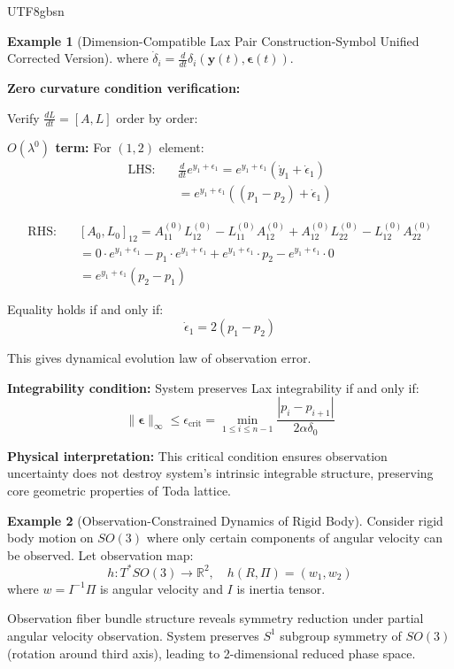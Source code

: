 \documentclass[a4paper,12pt]{extarticle}
\theoremstyle{definition}
\newtheorem{example}{Example}
\begin{document}
\begin{CJK}{UTF8}{gbsn}
\begin{example}[Dimension-Compatible Lax Pair Construction-Symbol Unified Corrected Version]
where $\dot{\delta}_i = \frac{d}{dt}\delta_i(\boldsymbol{y}(t), \boldsymbol{\epsilon}(t))$.

\textbf{Zero curvature condition verification:}

Verify $\frac{dL}{dt} = [A, L]$ order by order:

\textbf{$O(\lambda^0)$ term:} For $(1,2)$ element:
\begin{align*}
\text{LHS:} \quad &\frac{d}{dt}e^{y_1 + \epsilon_1} = e^{y_1 + \epsilon_1}(\dot{y}_1 + \dot{\epsilon}_1) \\
&= e^{y_1 + \epsilon_1}((p_1 - p_2) + \dot{\epsilon}_1)
\end{align*}

\begin{align*}
\text{RHS:} \quad &[A_0, L_0]_{12} = A_{11}^{(0)} L_{12}^{(0)} - L_{11}^{(0)} A_{12}^{(0)} + A_{12}^{(0)} L_{22}^{(0)} - L_{12}^{(0)} A_{22}^{(0)} \\
&= 0 \cdot e^{y_1 + \epsilon_1} - p_1 \cdot e^{y_1 + \epsilon_1} + e^{y_1 + \epsilon_1} \cdot p_2 - e^{y_1 + \epsilon_1} \cdot 0 \\
&= e^{y_1 + \epsilon_1}(p_2 - p_1)
\end{align*}

Equality holds if and only if:
$$\dot{\epsilon}_1 = 2(p_1 - p_2)$$

This gives dynamical evolution law of observation error.

\textbf{Integrability condition:} System preserves Lax integrability if and only if:
$$\|\boldsymbol{\epsilon}\|_{\infty} \leq \epsilon_{\text{crit}} = \min_{1 \leq i \leq n-1} \frac{|p_i - p_{i+1}|}{2\alpha\delta_0}$$

\textbf{Physical interpretation:} This critical condition ensures observation uncertainty does not destroy system's intrinsic integrable structure, preserving core geometric properties of Toda lattice.
\end{example}



\begin{example}[Observation-Constrained Dynamics of Rigid Body]
Consider rigid body motion on $SO(3)$ where only certain components of angular velocity can be observed. Let observation map:
$$h: T^*SO(3) \to \mathbb{R}^2, \quad h(R, \Pi) = (w_1, w_2)$$
where $w = I^{-1}\Pi$ is angular velocity and $I$ is inertia tensor.

Observation fiber bundle structure reveals symmetry reduction under partial angular velocity observation. System preserves $S^1$ subgroup symmetry of $SO(3)$ (rotation around third axis), leading to 2-dimensional reduced phase space.
\end{example}


\end{CJK}
\end{document}
